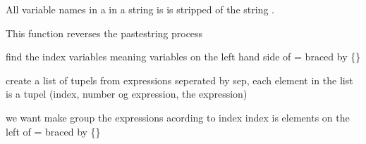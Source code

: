 \documentclass[letterpaper,10pt,english]{sphinxmanual}
\begin{document}

\begin{fulllineitems}
\label{\detokenize{onboard/modelmanipulation:modelmanipulation.stripstring}}
\pysigstartsignatures
{}
\pysigstopsignatures
\sphinxAtStartPar
All variable names in a  in a string is  is stripped of the string .

\sphinxAtStartPar
This function reverses the pastestring process

\end{fulllineitems}


\begin{fulllineitems}
\label{\detokenize{onboard/modelmanipulation:modelmanipulation.findindex}}
\pysigstartsignatures
{}
\pysigstopsignatures
\sphinxAtStartPar
find the index variables meaning variables on the left hand side of = braced by \{\}

\end{fulllineitems}


\begin{fulllineitems}
\label{\detokenize{onboard/modelmanipulation:modelmanipulation.doablelist}}
\pysigstartsignatures
{}
\pysigstopsignatures
\sphinxAtStartPar
create a list of tupels from expressions seperated by sep,
each element in the list is a tupel (index, number og expression, the expression)

\sphinxAtStartPar
we want make group the expressions acording to index
index is elements on the left of = braced by \{\}

\end{fulllineitems}
\end{document}
